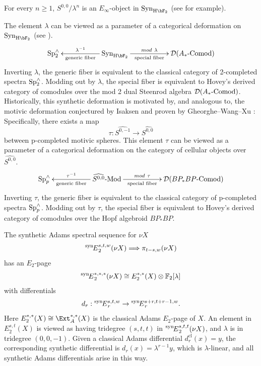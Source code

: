 \documentclass{amsart}
\numberwithin{equation}{section}
\newcommand{\SynSS}{\prescript{\mathrm{syn}\!}{}{E}}
\newcommand{\HF}{\mathrm{H}\bF_2}
\begin{document}
\begin{remark}
For every $n\ge 1$, $S^{0,0}/\lambda^n$ is an $E_\infty$-object in $\mathrm{Syn}_{\HF}$ (see \cite[Appendix B, C]{BHSmot} for example).
\end{remark}

\begin{remark} \label{rem:deformation}
The element $\lambda$ can be viewed as a parameter of a categorical deformation on $\mathrm{Syn}_{\HF}$ (see \cite{Pst}). 
$$\xymatrix{\textup{Sp}^\wedge_2 & & \mathrm{Syn}_{\HF}\ar[ll]_-{\lambda^{-1}}^-{\textup{generic fiber}} \ar[rr]^-{mod ~  \lambda}_-{\textup{special fiber}} & & \mathcal{D}(A_*\textup{-Comod})}$$
Inverting $\lambda$, the generic fiber is equivalent to the classical category of 2-completed spectra $\textup{Sp}^\wedge_2$. Modding out by $\lambda$, the special fiber is equivalent to Hovey's derived category \cite{Hovey} of comodules over the mod 2 dual Steenrod algebra $\mathcal{D}(A_*\textup{-Comod})$. Historically, this synthetic deformation is motivated by, and analogous to, the motivic deformation conjectured by Isaksen and proven by Gheorghe--Wang--Xu \cite{GWX}: Specifically, there exists a map
$$\tau: \widehat{S^{0,-1}} \rightarrow \widehat{S^{0,0}}$$
between p-completed motivic spheres. This element $\tau$
can be viewed as a parameter of a categorical deformation on the category of cellular objects over $\widehat{S^{0,0}}$. 
$$\xymatrix{\textup{Sp}^\wedge_p & & \widehat{S^{0,0}}\textup{-Mod}\ar[ll]_-{\tau^{-1}}^-{\textup{generic fiber}} \ar[rr]^-{mod ~  \tau}_-{\textup{special fiber}} & & \mathcal{D}(BP_*BP\textup{-Comod})}$$
Inverting $\tau$, the generic fiber is equivalent to the classical category of p-completed spectra $\textup{Sp}^\wedge_p$. Modding out by $\tau$, the special fiber is equivalent to Hovey's derived category of comodules over the Hopf algebroid $BP_*BP$. 
\end{remark}

\begin{theorem} \label{thm:rigid}
    The synthetic Adams spectral sequence for $\nu X$
     $$\SynSS_2^{s,t,w}(\nu X)\Longrightarrow \pi_{t-s,w}(\nu X)$$
     has an $E_2$-page 
    $$\SynSS_2^{*,*,*}(\nu X) \cong E_2^{*,*}(X)\otimes \mathbb{F}_2[\lambda]$$
    with differentials
    $$d_r: \SynSS_r^{s,t,w}\to \SynSS_r^{s+r,t+r-1,w}.$$
    Here $E_2^{*,*}(X) \cong \Ext_A^{*,*}(X)$ is the classical Adams $E_2$-page of $X$. An element in $E_2^{s,t}(X)$ is viewed as having tridegree $(s, t, t)$ in $\SynSS_2^{s,t,t}(\nu X)$, and $\lambda$ is in tridegree $(0, 0, -1)$. Given a classical Adams differential $d_r^{\mathrm{cl}}(x)=y$, the corresponding synthetic differential is $d_r(x)=\lambda^{r-1}y$, which is $\lambda$-linear, and all synthetic Adams differentials arise in this way.
\end{theorem}
\end{document}
